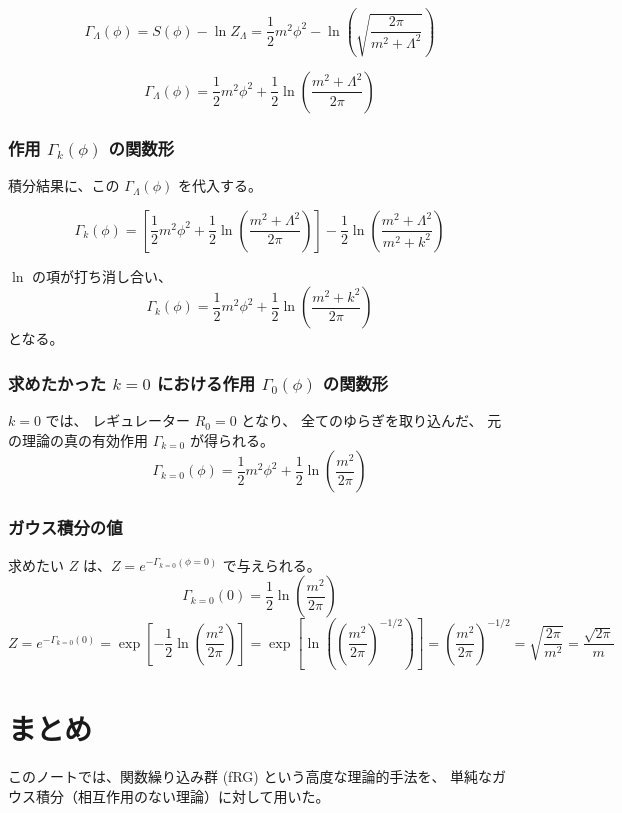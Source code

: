\documentclass[uplatex,a4j,12pt,dvipdfmx]{jsarticle}
\begin{document}
\[
	\Gamma_\Lambda(\phi) = S(\phi) - \ln Z_\Lambda = \frac{1}{2}m^2 \phi^2 - \ln \left( \sqrt{\frac{2\pi}{m^2+\Lambda^2}} \right)
\]

\[
	\Gamma_\Lambda(\phi) = \frac{1}{2}m^2 \phi^2 + \frac{1}{2} \ln \left( \frac{m^2+\Lambda^2}{2\pi} \right)
\]

\subsubsection{作用 $\Gamma_{k}(\phi)$ の関数形}

積分結果に、この $\Gamma_\Lambda(\phi)$ を代入する。

\[
	\Gamma_k(\phi) = \left[ \frac{1}{2}m^2 \phi^2 + \frac{1}{2} \ln \left( \frac{m^2+\Lambda^2}{2\pi} \right) \right] - \frac{1}{2} \ln \left( \frac{m^{2} + \Lambda^{2}}{m^{2}+k^{2}} \right)
\]

$\ln$ の項が打ち消し合い、
\[
	\Gamma_k(\phi) = \frac{1}{2}m^2 \phi^2 + \frac{1}{2} \ln \left( \frac{m^2+k^2}{2\pi} \right)
\]
となる。
\subsubsection{求めたかった $k=0$ における作用 $\Gamma_{0}(\phi)$ の関数形}

$k=0$ では、
レギュレーター $R_0 = 0$ となり、
全てのゆらぎを取り込んだ、
元の理論の真の有効作用 $\Gamma_{k=0}$ が得られる。
\[
	\Gamma_{k=0}(\phi) = \frac{1}{2}m^2 \phi^2 + \frac{1}{2} \ln \left( \frac{m^2}{2\pi} \right)
\]

\subsubsection{ガウス積分の値}

求めたい $Z$ は、$Z = e^{-\Gamma_{k=0}(\phi=0)}$ で与えられる。
\[
	\Gamma_{k=0}(0) = \frac{1}{2} \ln \left( \frac{m^2}{2\pi} \right)
\]
\[
	Z = e^{-\Gamma_{k=0}(0)} = \exp \left[ -\frac{1}{2} \ln \left( \frac{m^2}{2\pi} \right) \right]
	= \exp \left[ \ln \left( \left(\frac{m^2}{2\pi}\right)^{-1/2} \right) \right]
	= \left( \frac{m^2}{2\pi} \right)^{-1/2}
	= \sqrt{\frac{2\pi}{m^2}}
	= \frac{\sqrt{2\pi}}{m}
\]
\section{まとめ}

このノートでは、関数繰り込み群 (fRG) という高度な理論的手法を、
単純なガウス積分（相互作用のない理論）に対して用いた。
\end{document}
